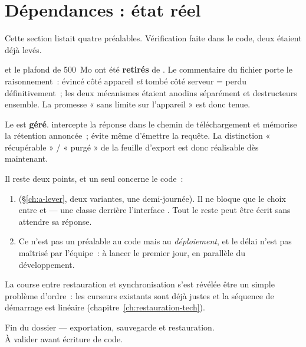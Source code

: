 \documentclass[11pt,a4paper,oneside]{report}
\begin{document}
\section{Dépendances : état réel}

Cette section listait quatre préalables. Vérification faite dans le code, deux étaient déjà
levés.

\begin{constat}
 et le plafond de 500~Mo ont été \textbf{retirés} de
. Le commentaire du fichier porte le raisonnement~: évincé
côté appareil \emph{et} tombé côté serveur = perdu définitivement~; les deux mécanismes
étaient anodins séparément et destructeurs ensemble. La promesse « sans limite sur
l'appareil » est donc tenue.
\end{constat}

\begin{constat}
Le  est \textbf{géré}. 
intercepte la réponse dans le chemin de téléchargement et mémorise la rétention annoncée~;
 évite même d'émettre la requête. La distinction « récupérable » /
« purgé » de la feuille d'export est donc réalisable dès maintenant.
\end{constat}

Il reste deux points, et un seul concerne le code~:

\begin{enumerate}[leftmargin=*]
  \item {} (§\ref{ch:a-lever}, deux variantes, une
        demi-journée). Il ne bloque que le choix entre  et
         --- une classe derrière l'interface .
        Tout le reste peut être écrit sans attendre sa réponse.
  \item {}
        Ce n'est pas un préalable au code mais au \emph{déploiement}, et le délai n'est pas
        maîtrisé par l'équipe~: à lancer le premier jour, en parallèle du développement.
\end{enumerate}

\begin{note}
La course entre restauration et synchronisation s'est révélée être un simple problème
d'ordre~: les curseurs existants sont déjà justes et la séquence de démarrage est linéaire
(chapitre~\ref{ch:restauration-tech}).
\end{note}

\vfill
\begin{center}\small\color{AlanyaGray}\sffamily
Fin du dossier --- exportation, sauvegarde et restauration.\\
À valider avant écriture de code.
\end{center}
\end{document}
